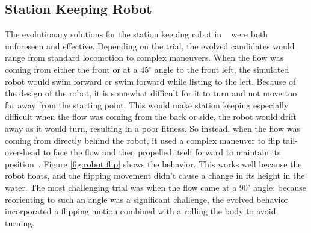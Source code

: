 \documentclass{sig-alternate}
\begin{document}
\subsection{Station Keeping Robot}\label{Moore behavior}
  The evolutionary solutions for the station keeping robot in ~\cite{Moore:2013:ESK:2463372.2463402} were both unforeseen and effective. Depending on the trial, the evolved candidates would range from standard locomotion to complex maneuvers. When the flow was coming from either the front or at a 45$^\circ$ angle to the front left, the simulated robot would swim forward or swim forward while listing to the left. Because of the design of the robot, it is somewhat difficult for it to turn and not move too far away from the starting point. This would make station keeping especially difficult when the flow was coming from the back or side, the robot would drift away as it would turn, resulting in a poor fitness. So instead, when the flow was coming from directly behind the robot, it used a complex maneuver to flip tail-over-head to face the flow and then propelled itself forward to maintain its position~\cite{MooreYouTube}. Figure \ref{fig:robot flip} shows the behavior. This works well because the robot floats, and the flipping movement didn't cause a change in its height in the water. The most challenging trial was when the flow came at a 90$^\circ$ angle; because reorienting to such an angle was a significant challenge, the evolved behavior incorporated a flipping motion combined with a rolling the body to avoid turning.
 
\end{document}
